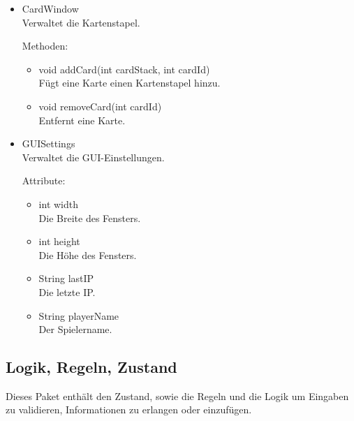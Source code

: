 \documentclass[a4paper,10pt]{article}
\begin{document}
\begin{itemize}
\item CardWindow \\
Verwaltet die Kartenstapel.

Methoden:
\begin{itemize}
\item void addCard(int cardStack, int cardId) \\
Fügt eine Karte einen Kartenstapel hinzu.
\item void removeCard(int cardId) \\
Entfernt eine Karte.
\end{itemize}

\item GUISettings \\
Verwaltet die GUI-Einstellungen.

Attribute:
\begin{itemize}
\item int width \\
Die Breite des Fensters.
\item int height \\
Die Höhe des Fensters.
\item String lastIP \\
Die letzte IP.
\item String playerName \\
Der Spielername.
\end{itemize}
\end{itemize}

\subsection{Logik, Regeln, Zustand}

Dieses Paket enthält den Zustand, sowie die Regeln und die Logik um Eingaben zu validieren, Informationen zu erlangen oder einzufügen.
\end{document}
